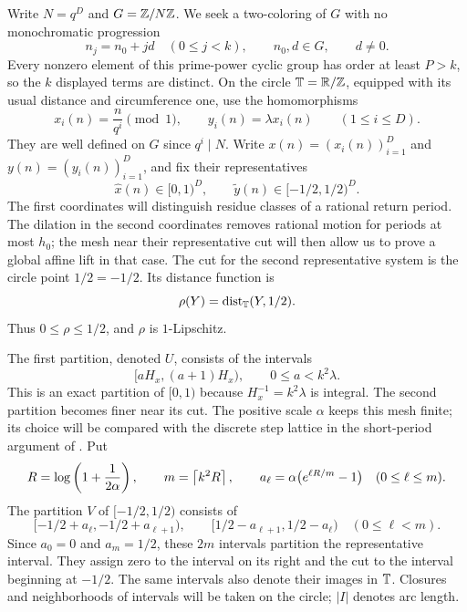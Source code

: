 Write $N=q^D$ and $G=\mathbb Z/N\mathbb Z$. We seek a two-coloring of $G$ with no
monochromatic progression
\begin{equation}\label{setup:cyclic}
 n_j=n_0+jd\quad(0\le j<k),\qquad n_0,d\in G,\qquad d\ne0.
\end{equation}
Every nonzero element of this prime-power cyclic group has order at
least $P>k$, so the $k$ displayed terms are distinct. On the circle
$\mathbb T=\mathbb R/\mathbb Z$, equipped with its usual distance and circumference one,
use the homomorphisms
\begin{equation}\label{setup:coordinates}
 x_i(n)=\frac n{q^i}\pmod1,\qquad
 y_i(n)=\lambda x_i(n)\qquad(1\le i\le D).
\end{equation}
They are well defined on $G$ since $q^i\mid N$. Write
$x(n)=(x_i(n))_{i=1}^D$ and $y(n)=(y_i(n))_{i=1}^D$, and fix their
representatives
\[
 \hat x(n)\in[0,1)^D,\qquad \tilde y(n)\in[-1/2,1/2)^D.
\]
The first coordinates will distinguish residue classes of a rational
return period. The dilation in the second coordinates removes rational
motion for periods at most $h_0$; the mesh near their representative
cut will then allow us to prove a global affine lift in that case.
The cut for the second representative system is the circle point
$1/2=-1/2$. Its distance function is
\begin{equation}\label{setup:cut-distance}
 \rho(Y)=\operatorname{dist}_{\mathbb T}(Y,1/2).
\end{equation}
Thus $0\le\rho\le1/2$, and $\rho$ is $1$-Lipschitz.

The first partition, denoted $U$, consists of the intervals
\[
 [aH_x,(a+1)H_x),\qquad 0\le a<k^2\lambda.
\]
This is an exact partition of $[0,1)$ because $H_x^{-1}=k^2\lambda$
is integral. The second partition becomes finer near its cut.
The positive scale $\alpha$ keeps this mesh finite; its choice will
be compared with the discrete step lattice in the short-period
argument of . Put
\begin{equation}\label{mesh:definition}
 R=\log\left(1+\frac1{2\alpha}\right),\qquad
 m=\left\lceil k^2R\right\rceil,\qquad
 a_\ell=\alpha\bigl(e^{\ell R/m}-1\bigr)\quad(0\le\ell\le m).
\end{equation}
The partition $V$ of $[-1/2,1/2)$ consists of
\begin{equation}\label{mesh:intervals}
 [-1/2+a_\ell,-1/2+a_{\ell+1}),\qquad
 [1/2-a_{\ell+1},1/2-a_\ell)
 \quad(0\le\ell<m).
\end{equation}
Since $a_0=0$ and $a_m=1/2$, these $2m$ intervals partition the
representative interval. They assign zero to the interval on its
right and the cut to the interval beginning at $-1/2$.
The same intervals also denote their images in $\mathbb T$. Closures and
neighborhoods of intervals will be taken on the circle; $|I|$ denotes
arc length.

